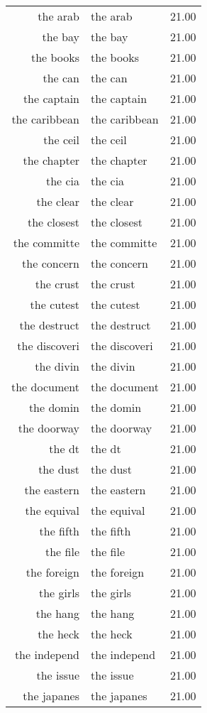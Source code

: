\begin{table}[ht]
\begin{tabular}{rlr}
  the arab & the arab & 21.00 \\ 
  the bay & the bay & 21.00 \\ 
  the books & the books & 21.00 \\ 
  the can & the can & 21.00 \\ 
  the captain & the captain & 21.00 \\ 
  the caribbean & the caribbean & 21.00 \\ 
  the ceil & the ceil & 21.00 \\ 
  the chapter & the chapter & 21.00 \\ 
  the cia & the cia & 21.00 \\ 
  the clear & the clear & 21.00 \\ 
  the closest & the closest & 21.00 \\ 
  the committe & the committe & 21.00 \\ 
  the concern & the concern & 21.00 \\ 
  the crust & the crust & 21.00 \\ 
  the cutest & the cutest & 21.00 \\ 
  the destruct & the destruct & 21.00 \\ 
  the discoveri & the discoveri & 21.00 \\ 
  the divin & the divin & 21.00 \\ 
  the document & the document & 21.00 \\ 
  the domin & the domin & 21.00 \\ 
  the doorway & the doorway & 21.00 \\ 
  the dt & the dt & 21.00 \\ 
  the dust & the dust & 21.00 \\ 
  the eastern & the eastern & 21.00 \\ 
  the equival & the equival & 21.00 \\ 
  the fifth & the fifth & 21.00 \\ 
  the file & the file & 21.00 \\ 
  the foreign & the foreign & 21.00 \\ 
  the girls & the girls & 21.00 \\ 
  the hang & the hang & 21.00 \\ 
  the heck & the heck & 21.00 \\ 
  the independ & the independ & 21.00 \\ 
  the issue & the issue & 21.00 \\ 
  the japanes & the japanes & 21.00 \\ 

\end{tabular}
\end{table}
